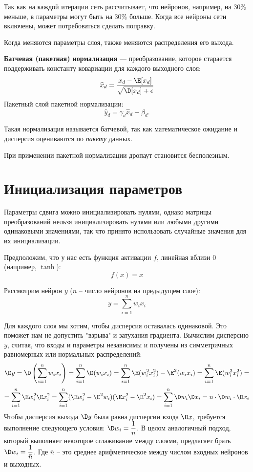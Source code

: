 \begin{remark}
    Так как на каждой итерации сеть рассчитывает, что нейронов, например, на 30\% меньше, в параметры могут быть на 30\% больше. Когда все нейроны сети включены, может потребоваться сделать поправку.
\end{remark}

\begin{remark}
    Когда меняются параметры слоя, также меняются распределения его выхода.
\end{remark}

\begin{definition}
    \textbf{Батчевая (пакетная) нормализация} --- преобразование, которое старается поддерживать константу ковариации для каждого выходного слоя:
    \[
        \widehat{x}_d=\dfrac{x_d-\E[x_d]}{\sqrt{\D[x_d] + \epsilon}}
    \]
    Пакетный слой пакетной нормализации:
    \[
        \widehat{y}_d=\gamma_d\widehat{x}_d+\beta_d.
    \]
\end{definition}

\begin{remark}
    Такая нормализация называется батчевой, так как математическое ожидание и дисперсия оцениваются по \textit{пакету} данных.
\end{remark}

\begin{remark}
    При применении пакетной нормализации дропаут становится бесполезным.
\end{remark}

\section{Инициализация параметров}

\begin{remark}
    Параметры сдвига можно инициализировать нулями, однако матрицы преобразований нельзя инициализировать нулями или любыми другими одинаковыми значениями, так что принято использовать случайные значения для их инициализации.
\end{remark}

Предположим, что у нас есть функция активации $f$, линейная вблизи $0$ (например, $\tanh$):
\[
    f(x)=x
\]

Рассмотрим нейрон $y$ ($n$ -- число нейронов на предыдущем слое):
\[
    y=\sum_{i=1}^nw_ix_i
\]

Для каждого слоя мы хотим, чтобы дисперсия оставалась одинаковой. Это поможет нам не допустить "взрыва" и затухания градиента. Вычислим дисперсию $y$, считая, что входы и параметры независимы и получены из симметричных равномерных или нормальных распределений:
\[
    \D y=\D\left(\sum_{i=1}^nw_ix_i\right)=\sum_{i=1}^n\D(w_ix_i)=\sum_{i=1}^n\E(w_i^2x_i^2)-\E^2(w_ix_i)=\sum_{i=1}^n\E(w_i^2x_i^2)=
\]
\[
    =\sum_{i=1}^n\E w_i^2\E x_i^2=\sum_{i=1}^n(\E w_i^2-\E^2w_i)(\E x_i^2-\E^2x_i)=\sum_{i=1}^n\D w_i\D x_i=n\cdot\D w_i\cdot\D x_i
\]
Чтобы дисперсия выхода $\D y$ была равна дисперсии входа $\D x$, требуется выполнение следующего условия: $\D w_i=\dfrac{1}{n}$. В целом аналогичный подход, который выполняет некоторое сглаживание между слоями, предлагает брать $\D w_i=\dfrac{1}{\bar{n}}$. Где $\bar{n}$ -- это среднее арифметическое между числом входных нейронов и выходных.

